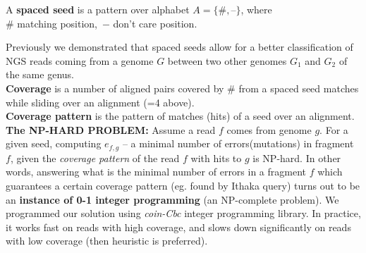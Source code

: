 \documentclass[portrait,final,a0paper,fontscale=0.277]{baposter}
\begin{document}
\begin{poster}
{  A {\bf spaced seed} is a pattern over alphabet 
  $A=\{\textbf{\#}, \textbf{--}\}$, where\\
  $\#$ matching position,\, $-$ don't care position.
\vspace{-0.5em}  
\vspace{-0.8em}

Previously\cite{sseed} we demonstrated that spaced seeds allow for a better
   classification of NGS reads coming from a genome $G$ between two
  other genomes $G_1$ and $G_2$ of the same genus.
\\  
 {\bf Coverage} is a number of aligned pairs covered 
 by $\textbf{\#}$ from a spaced seed matches while sliding over an alignment 
 (=4 above). 
 \\
{\bf Coverage pattern} is the pattern of matches (hits) of a seed over an alignment.
\\
{\bf The NP-HARD PROBLEM:}  Assume a read $f$ comes from genome $g$.
For a given seed, computing $e_{f,g}$ -- a minimal number of errors(mutations) in fragment $f$, given the {\em coverage pattern} of the read $f$ with hits to $g$ is NP-hard. In other words, answering what is the minimal number of errors in a fragment $f$ which guarantees a certain coverage pattern (eg. found by Ithaka query) turns out to be an {\bf instance of 0-1 integer programming} (an NP-complete problem). We programmed our solution using {\em coin-Cbc} integer programming library. In practice, it works fast on reads with high coverage, and slows down significantly on reads with low coverage (then heuristic is preferred).
   \vspace{0.3em}
  }


\end{poster}
\end{document}
